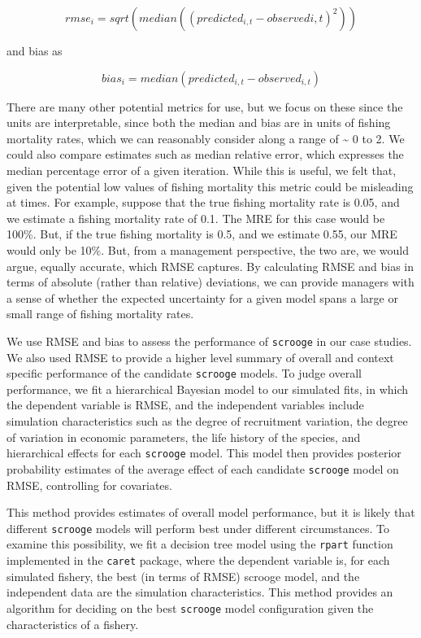 \documentclass[twoside,12pt,final]{ucthesis-CA2012}
\begin{document}
\begin{ucmainmatter}
\[rmse_{i} = sqrt(median((predicted_{i,t} - observed{i,t})^2))\]

and bias as

\[bias_{i} = median(predicted_{i,t} - observed_{i,t})\]

There are many other potential metrics for use, but we focus on these
since the units are interpretable, since both the median and bias are in
units of fishing mortality rates, which we can reasonably consider along
a range of \textasciitilde{} 0 to 2. We could also compare estimates
such as median relative error, which expresses the median percentage
error of a given iteration. While this is useful, we felt that, given
the potential low values of fishing mortality this metric could be
misleading at times. For example, suppose that the true fishing
mortality rate is 0.05, and we estimate a fishing mortality rate of 0.1.
The MRE for this case would be 100\%. But, if the true fishing mortality
is 0.5, and we estimate 0.55, our MRE would only be 10\%. But, from a
management perspective, the two are, we would argue, equally accurate,
which RMSE captures. By calculating RMSE and bias in terms of absolute
(rather than relative) deviations, we can provide managers with a sense
of whether the expected uncertainty for a given model spans a large or
small range of fishing mortality rates.

We use RMSE and bias to assess the performance of \texttt{scrooge} in
our case studies. We also used RMSE to provide a higher level summary of
overall and context specific performance of the candidate
\texttt{scrooge} models. To judge overall performance, we fit a
hierarchical Bayesian model to our simulated fits, in which the
dependent variable is RMSE, and the independent variables include
simulation characteristics such as the degree of recruitment variation,
the degree of variation in economic parameters, the life history of the
species, and hierarchical effects for each \texttt{scrooge} model. This
model then provides posterior probability estimates of the average
effect of each candidate \texttt{scrooge} model on RMSE, controlling for
covariates.

This method provides estimates of overall model performance, but it is
likely that different \texttt{scrooge} models will perform best under
different circumstances. To examine this possibility, we fit a decision
tree model using the \texttt{rpart} function implemented in the
\texttt{caret} package, where the dependent variable is, for each
simulated fishery, the best (in terms of RMSE) scrooge model, and the
independent data are the simulation characteristics. This method
provides an algorithm for deciding on the best \texttt{scrooge} model
configuration given the characteristics of a fishery.


\end{ucmainmatter}
\end{document}
